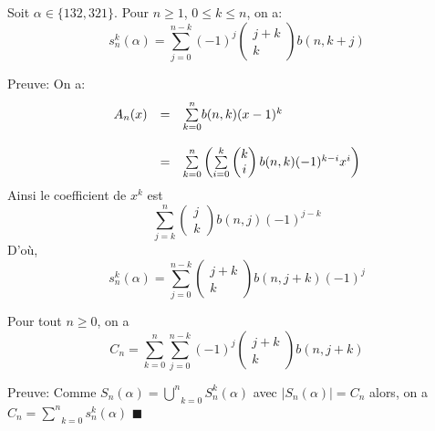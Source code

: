 \begin{proposition}
	Soit $\alpha\in\{132,321\}$. Pour $n\geq1$, $0\leq k\leq n$, on a:\[
		s_{n}^{k}(\alpha)=\underset{j=0}{\overset{n-k}{\sum}}(-1)^{j}\begin{pmatrix} j+k\\k\end{pmatrix}b(n, k+j)%
	\]
\end{proposition}
Preuve:
On a:
\[
	\begin{array}{l l l}
		A_{n}(x) & =       & \underset{k=0}{\overset{n}{\sum}}b(n,k)(x-1)^{k}                                                                                      \\
		         & \text{} &                                                                                                                                       \\
		         & =       & \underset{k=0}{\overset{n}{\sum}}\left(\underset{i=0}{\overset{k}{\sum}}\begin{pmatrix} k\\i\end{pmatrix}b(n,k)(-1)^{k-i}x^{i}\right) \\
	\end{array}
\]
Ainsi le coefficient de $x^{k}$ est\[\underset{j=k}{\overset{n}{\sum}}\begin{pmatrix} j\\k\end{pmatrix}b(n,j)(-1)^{j-k}\]
D'où, \[s_{n}^{k}(\alpha)=\underset{j=0}{\overset{n-k}{\sum}}\begin{pmatrix} j+k\\k\end{pmatrix}b(n,j+k)(-1)^{j}\]

\begin{proposition}
	Pour tout $ n\geq 0$, on a \[C_{n}=\underset{k=0}{\overset{n}{\sum}}\underset{j=0}{\overset{n-k}{\sum}}(-1)^{j}\begin{pmatrix} j+k\\k\end{pmatrix}b(n,j+k)\]
\end{proposition}
Preuve:
Comme $S_{n}(\alpha)=\underset{k=0}{\overset{n}{\bigcup}}S_{n}^{k}(\alpha)$ avec $|S_{n}(\alpha)|=C_{n}$ alors, on a $C_{n}=\underset{k=0}{\overset{n}{\sum}}s_{n}^{k}(\alpha)$ $\blacksquare$

